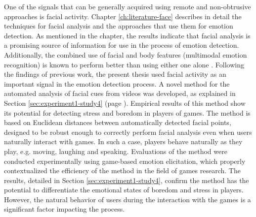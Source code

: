 One of the signals that can be generally acquired using remote and non-obtrusive approaches is facial activity. Chapter \ref{ch:literature-face} describes in detail the techniques for facial analysis and the approaches that use them for emotion detection. As mentioned in the chapter, the results indicate that facial analysis is a promising source of information for use in the process of emotion detection. Additionally, the combined use of facial and body features (multimodal emotion recognition) is known to perform better than using either one alone \parencite{zacharatos2014automatic}. Following the findings of previous work, the present thesis used facial activity as an important signal in the emotion detection process. A novel method for the automated analysis of facial cues from videos was developed, as explained in Section \ref{sec:experiment1-study4} (page \pageref{sec:experiment1-study4}). Empirical results of this method show its potential for detecting stress and boredom in players of games. The method is based on Euclidean distances between automatically detected facial points, designed to be robust enough to correctly perform facial analysis even when users naturally interact with games. In such a case, players behave naturally as they play, e.g. moving, laughing and speaking. Evaluations of the method were conducted experimentally using game-based emotion elicitation, which properly contextualized the efficiency of the method in the field of games research. The results, detailed in Section \ref{sec:experiment1-study4}, confirm the method has the potential to differentiate the emotional states of boredom and stress in players. However, the natural behavior of users during the interaction with the games is a significant factor impacting the process.


